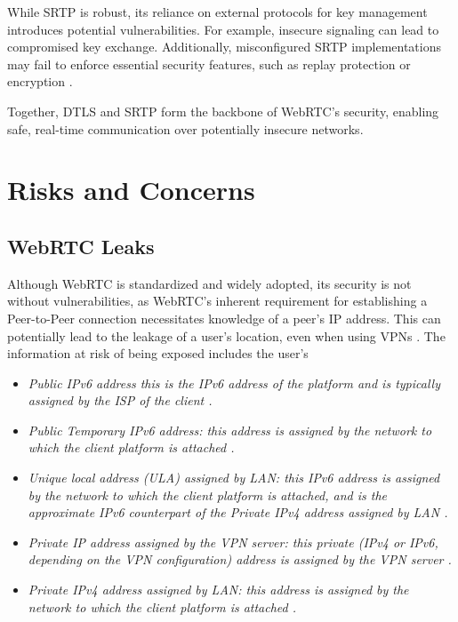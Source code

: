 \documentclass[conference]{IEEEtran}
\begin{document}
While SRTP is robust, its reliance on external protocols for key management introduces potential vulnerabilities. For example, 
insecure signaling can lead to compromised key exchange. Additionally, misconfigured SRTP implementations may fail to enforce 
essential security features, such as replay protection or encryption \cite{RFC3711}.

Together, DTLS and SRTP form the backbone of WebRTC's security, enabling safe, real-time communication over potentially insecure networks.

\section{Risks and Concerns}
\subsection{WebRTC Leaks}
Although WebRTC is standardized and widely adopted, its security is not without vulnerabilities, as WebRTC's inherent requirement for 
establishing a Peer-to-Peer connection necessitates knowledge of a peer's IP address. This can potentially lead to 
the leakage of a user's location, even when using VPNs \cite{One_leak_will_sink_a_ship}.
The information at risk of being exposed includes the user's
\begin{itemize}
    \item \it{Public IPv6 address} this is the IPv6 address of the
    platform and is typically assigned by the ISP of the client \cite{One_leak_will_sink_a_ship}.
    \item \it{Public Temporary IPv6 address:} this address is assigned
    by the network to which the client platform is attached \cite{One_leak_will_sink_a_ship}.
    \item \it{Unique local address (ULA) assigned by LAN:} this IPv6
    address is assigned by the network to which the client
    platform is attached, and is the approximate IPv6 counterpart of 
    the Private IPv4 address assigned by LAN \cite{One_leak_will_sink_a_ship}.
    \item \it{Private IP address assigned by the VPN server:} this private 
    (IPv4 or IPv6, depending on the VPN configuration)
    address is assigned by the VPN server \cite{One_leak_will_sink_a_ship}.
    \item \it{Private IPv4 address assigned by LAN:} this address is 
    assigned by the network to which the client platform is
    attached \cite{One_leak_will_sink_a_ship}.
\end{itemize} 
\end{document}
